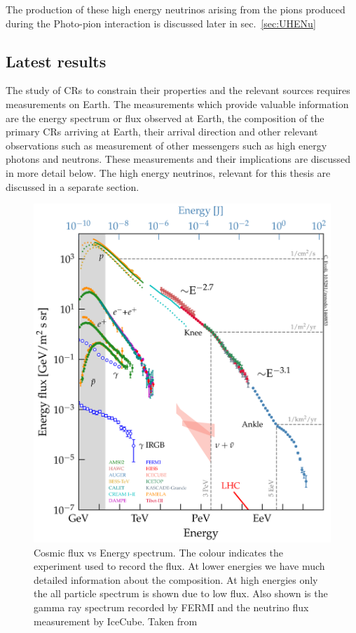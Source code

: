 The production of these high energy neutrinos arising from the pions produced during the Photo-pion interaction is discussed later in sec.~\ref{sec:UHENu} 

\subsection{Latest results}
\label{subsec:CRresults}
The study of CRs to constrain their properties and the relevant sources requires measurements on Earth. The measurements which provide valuable information are the energy spectrum or flux observed at Earth, the composition of the primary CRs arriving at Earth, their arrival direction and other relevant observations such as measurement of other messengers such as high energy photons and neutrons. These measurements and their implications are discussed in more detail below. The high energy neutrinos, relevant for this thesis are discussed in a separate section. 

\begin{figure}[t!]
  \centering
  \includegraphics[width=14.5cm]{thesis_figures/CRnNu/all_particle_spectrum.png}
  \caption{Cosmic flux vs Energy spectrum. The colour indicates the experiment used to record the flux. At lower energies we have much detailed information about the composition. At high energies only the all particle spectrum is shown due to low flux. Also shown is the gamma ray spectrum recorded by FERMI and the neutrino flux measurement by IceCube. Taken from ~\cite{evoli_2018_2360277}}
  \label{fig:CR-spectrum}
\end{figure}
